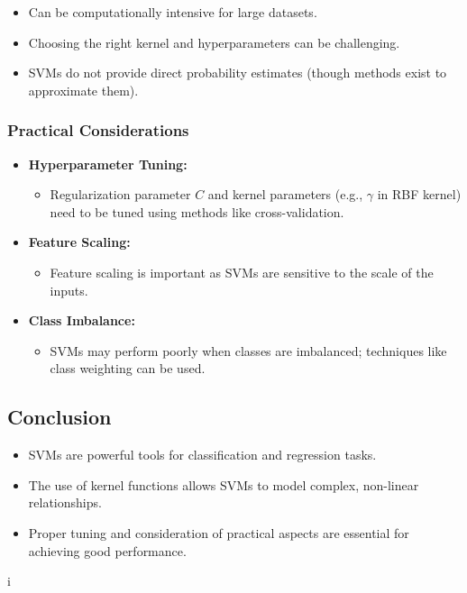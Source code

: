 \documentclass{article}
\begin{document}
\begin{itemize}
    \item Can be computationally intensive for large datasets.
    \item Choosing the right kernel and hyperparameters can be challenging.
    \item SVMs do not provide direct probability estimates (though methods exist to approximate them).
\end{itemize}

\subsubsection{Practical Considerations}

\begin{itemize}
    \item \textbf{Hyperparameter Tuning:}
    \begin{itemize}
        \item Regularization parameter $C$ and kernel parameters (e.g., $\gamma$ in RBF kernel) need to be tuned using methods like cross-validation.
    \end{itemize}
    \item \textbf{Feature Scaling:}
    \begin{itemize}
        \item Feature scaling is important as SVMs are sensitive to the scale of the inputs.
    \end{itemize}
    \item \textbf{Class Imbalance:}
    \begin{itemize}
        \item SVMs may perform poorly when classes are imbalanced; techniques like class weighting can be used.
    \end{itemize}
\end{itemize}

\subsection{Conclusion}

\begin{itemize}
    \item SVMs are powerful tools for classification and regression tasks.
    \item The use of kernel functions allows SVMs to model complex, non-linear relationships.
    \item Proper tuning and consideration of practical aspects are essential for achieving good performance.
\end{itemize}i
\end{document}

